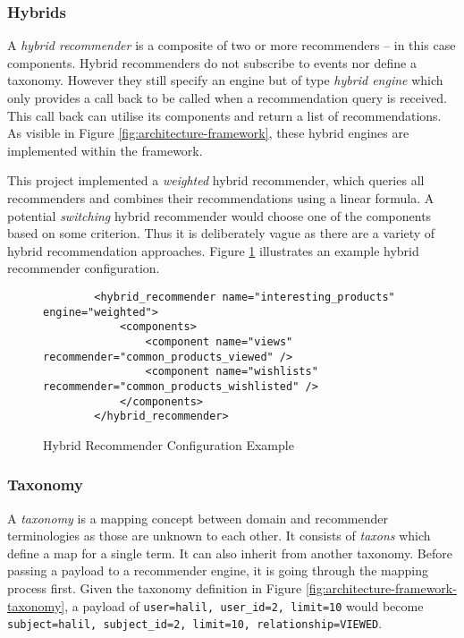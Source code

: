 \subsubsection{Hybrids}

A \emph{hybrid recommender} is a composite of two or more recommenders -- in this case components. Hybrid recommenders do not subscribe to events nor define a taxonomy. However they still specify an engine but of type \emph{hybrid engine} which only provides a call back to be called when a recommendation query is received. This call back can utilise its components and return a list of recommendations. As visible in Figure \ref{fig:architecture-framework}, these hybrid engines are implemented within the framework.

This project implemented a \emph{weighted} hybrid recommender, which queries all recommenders and combines their recommendations using a linear formula. A potential \emph{switching} hybrid recommender would choose one of the components based on some criterion. Thus it is deliberately vague as there are a variety of hybrid recommendation approaches. Figure \ref{fig:architecture-framework-hybrid-recommender} illustrates an example hybrid recommender configuration.

\begin{figure}[ht]
    \begin{verbatim}
        <hybrid_recommender name="interesting_products" engine="weighted">
            <components>
                <component name="views" recommender="common_products_viewed" />
                <component name="wishlists" recommender="common_products_wishlisted" />
            </components>
        </hybrid_recommender>
    \end{verbatim}
    \caption{Hybrid Recommender Configuration Example}
    \label{fig:architecture-framework-hybrid-recommender}
\end{figure}

\subsubsection{Taxonomy}

A \emph{taxonomy} is a mapping concept between domain and recommender terminologies as those are unknown to each other. It consists of \emph{taxons} which define a map for a single term. It can also inherit from another taxonomy. Before passing a payload to a recommender engine, it is going through the mapping process first. Given the taxonomy definition in Figure \ref{fig:architecture-framework-taxonomy}, a payload of \texttt{user=halil, user_id=2, limit=10} would become \texttt{subject=halil, subject_id=2, limit=10, relationship=VIEWED}.

